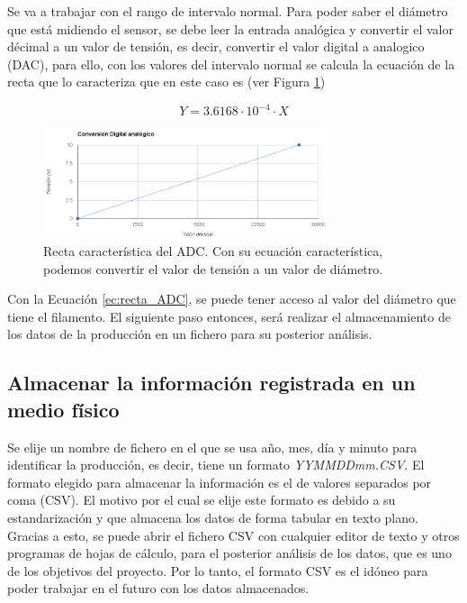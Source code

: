 Se va a trabajar con el rango de intervalo normal. Para poder saber el diámetro que está midiendo el sensor, se debe leer la entrada analógica y convertir el valor décimal a un valor de tensión, es decir, convertir el valor digital a analogico (DAC), para ello, con los valores del intervalo normal se calcula la ecuación de la recta que lo caracteriza que en este caso es (ver Figura \ref{fig:plc_DAC})

\begin{equation}
Y = 3.6168 \cdot 10^{-4} \cdot X
\label{ec:recta_ADC}
\end{equation}

\begin{figure}[H]
    \centering
    \includegraphics[width=0.75\textwidth]{images/PLC/image.png}
    \caption[Recta característica del ADC.]{Recta característica del ADC. Con su ecuación característica, podemos convertir el valor de tensión a un valor de diámetro.} 
    \label{fig:plc_DAC}
\end{figure}

Con la Ecuación \ref{ec:recta_ADC}, se puede tener acceso al valor del diámetro que tiene el filamento. El siguiente paso entonces, será realizar el almacenamiento de los datos de la producción en un fichero para su posterior análisis.

\subsection{Almacenar la información registrada en un medio físico}
\label{sec:plc_SD}

Se elije un nombre de fichero en el que se usa año, mes, día y minuto para identificar la producción, es decir, tiene un formato \textit{YYMMDDmm.CSV}. El formato elegido para almacenar la información es el de valores separados por coma (CSV). El motivo por el cual se elije este formato es debido a su estandarización y que almacena los datos de forma tabular en texto plano. Gracias a esto, se puede abrir el fichero CSV con cualquier editor de texto y otros programas de hojas de cálculo, para el posterior análisis de los datos, que es uno de los objetivos del proyecto. Por lo tanto, el formato CSV es el idóneo para poder trabajar en el futuro con los datos almacenados.\\

